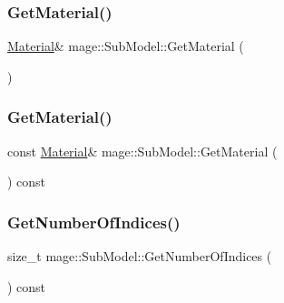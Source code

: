 \subsubsection{\texorpdfstring{Get\+Material()}{GetMaterial()}\hspace{0.1cm}{\footnotesize\ttfamily [1/2]}}
{\footnotesize\ttfamily \hyperlink{structmage_1_1_material}{Material}\& mage\+::\+Sub\+Model\+::\+Get\+Material (\begin{DoxyParamCaption}{ }\end{DoxyParamCaption})}

\hypertarget{classmage_1_1_sub_model_ab9e1c661e94a2ac0d819ad5d36a18a4c}{}\label{classmage_1_1_sub_model_ab9e1c661e94a2ac0d819ad5d36a18a4c} 
\subsubsection{\texorpdfstring{Get\+Material()}{GetMaterial()}\hspace{0.1cm}{\footnotesize\ttfamily [2/2]}}
{\footnotesize\ttfamily const \hyperlink{structmage_1_1_material}{Material}\& mage\+::\+Sub\+Model\+::\+Get\+Material (\begin{DoxyParamCaption}{ }\end{DoxyParamCaption}) const}

\hypertarget{classmage_1_1_sub_model_a18736678fc1a5d882776298053e037b3}{}\label{classmage_1_1_sub_model_a18736678fc1a5d882776298053e037b3} 
\subsubsection{\texorpdfstring{Get\+Number\+Of\+Indices()}{GetNumberOfIndices()}}
{\footnotesize\ttfamily size\+\_\+t mage\+::\+Sub\+Model\+::\+Get\+Number\+Of\+Indices (\begin{DoxyParamCaption}{ }\end{DoxyParamCaption}) const}

\hypertarget{classmage_1_1_sub_model_a2b901cb62dca26a7ff399719e0a4ba66}{}\label{classmage_1_1_sub_model_a2b901cb62dca26a7ff399719e0a4ba66} 
